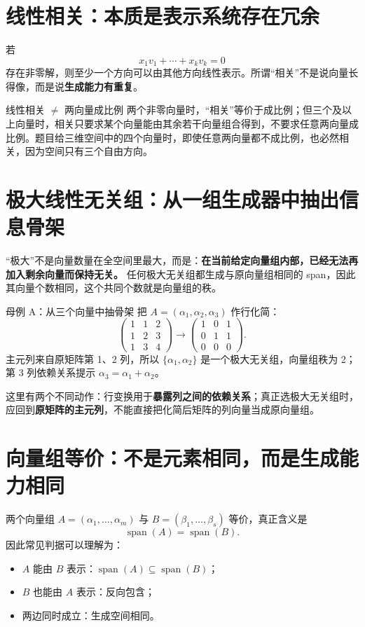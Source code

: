 \documentclass[11pt,a4paper,openany]{ctexbook}
\newcommand{\key}[1]{\textbf{\color{deep}#1}}
\begin{document}
\section{线性相关：本质是表示系统存在冗余}
若
\[
x_1v_1+\cdots+x_kv_k=0
\]
存在非零解，则至少一个方向可以由其他方向线性表示。所谓“相关”不是说向量长得像，而是说\key{生成能力有重复}。

\begin{boundarybox}{线性相关 $\neq$ 两向量成比例}
两个非零向量时，“相关”等价于成比例；但三个及以上向量时，相关只要求某个向量能由其余若干向量组合得到，不要求任意两向量成比例。题目给三维空间中的四个向量时，即使任意两向量都不成比例，也必然相关，因为空间只有三个自由方向。
\end{boundarybox}

\section{极大线性无关组：从一组生成器中抽出信息骨架}
“极大”不是向量数量在全空间里最大，而是：\key{在当前给定向量组内部，已经无法再加入剩余向量而保持无关。}
任何极大无关组都生成与原向量组相同的 span，因此其向量个数相同，这个共同个数就是向量组的秩。

\begin{examplebox}{母例 A：从三个向量中抽骨架}
把 $A=(\alpha_1,\alpha_2,\alpha_3)$ 作行化简：
\[
\begin{pmatrix}1&1&2\\1&2&3\\1&3&4\end{pmatrix}
\to
\begin{pmatrix}1&0&1\\0&1&1\\0&0&0\end{pmatrix}.
\]
主元列来自原矩阵第 1、2 列，所以 $\{\alpha_1,\alpha_2\}$ 是一个极大无关组，向量组秩为 2；第 3 列依赖关系提示 $\alpha_3=\alpha_1+\alpha_2$。

这里有两个不同动作：行变换用于\key{暴露列之间的依赖关系}；真正选极大无关组时，应回到\key{原矩阵的主元列}，不能直接把化简后矩阵的列向量当成原向量组。
\end{examplebox}

\section{向量组等价：不是元素相同，而是生成能力相同}
两个向量组 $A=(\alpha_1,\dots,\alpha_m)$ 与 $B=(\beta_1,\dots,\beta_s)$ 等价，真正含义是
\[
\operatorname{span}(A)=\operatorname{span}(B).
\]
因此常见判据可以理解为：
\begin{itemize}
  \item $A$ 能由 $B$ 表示：$\operatorname{span}(A)\subseteq\operatorname{span}(B)$；
  \item $B$ 也能由 $A$ 表示：反向包含；
  \item 两边同时成立：生成空间相同。
\end{itemize}
\end{document}
